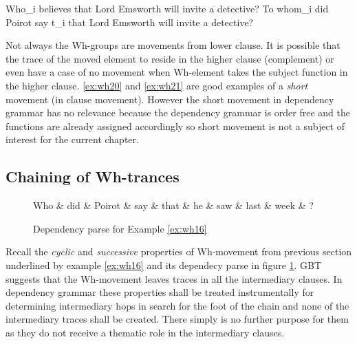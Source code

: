 \begin{exe}
	\ex\label{ex:wh20} Who_{i} believes that Lord Emsworth will invite a detective?
	\ex\label{ex:wh21} To whom_{i} did Poirot say t_{i} that Lord Emsworth will invite a detective?
\end{exe}

Not always the Wh-groups are movements from lower clause. It is possible that the trace of the moved element to reside in the higher clause (complement) or even have a case of no movement when Wh-element takes the subject function in the higher clause. \ref{ex:wh20} and \ref{ex:wh21} are good examples of a \textit{short} movement (in clause movement). However the short movement in dependency grammar has no relevance because the dependency grammar is order free and the functions are already assigned accordingly so short movement is not a subject of interest for the current chapter.

\subsection{Chaining of Wh-trances}
\label{sec:wh-traces}
\begin{figure}[H]
	\centering
	\begin{dependency}
		\begin{deptext}[]
			Who \& did \& Poirot \& say \& that \& he \& saw \& last \& week \& ?\\
		\end{deptext}
	\end{dependency}
	\caption{Dependency parse for Example \ref{ex:wh16}}
	\label{fig:e17}
\end{figure}

Recall the \textit{cyclic} and \textit{successive} properties of Wh-movement from previous section underlined by example \ref{ex:wh16} and its dependecy parse in figure \ref{fig:e17}. GBT suggests that the Wh-movement leaves traces in all the intermediary clauses. In dependency grammar these properties shall be treated instrumentally for determining intermediary hops in search for the foot of the chain and none of the intermediary traces shall be created. There simply is no further purpose for them as they do not receive a thematic role in the intermediary clauses. 

